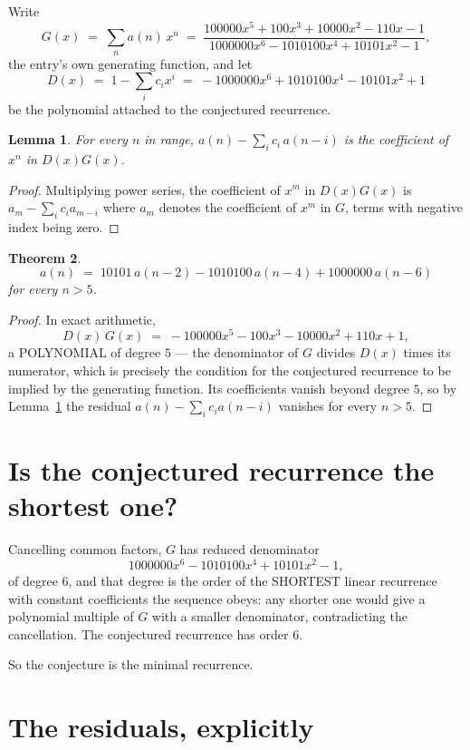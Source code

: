\documentclass[11pt,a4paper]{article}
\theoremstyle{plain}
\newtheorem{theorem}{Theorem}
\newtheorem{lemma}[theorem]{Lemma}
\theoremstyle{definition}
\begin{document}
Write
\[
G(x)\;=\;\sum_{n}a(n)\,x^{n}\;=\;\frac{100000 x^{5} + 100 x^{3} + 10000 x^{2} - 110 x - 1}{1000000 x^{6} - 1010100 x^{4} + 10101 x^{2} - 1},
\]
the entry's own generating function, and let
\[
D(x)\;=\;1-\sum_i c_i x^{i}\;=\;- 1000000 x^{6} + 1010100 x^{4} - 10101 x^{2} + 1
\]
be the polynomial attached to the conjectured recurrence.

\begin{lemma}\label{lem:key}
For every $n$ in range, $a(n)-\sum_i c_i\,a(n-i)$ is the coefficient of $x^{n}$ in
$D(x)G(x)$.
\end{lemma}

\begin{proof}
Multiplying power series, the coefficient of $x^{m}$ in $D(x)G(x)$ is
$a_m-\sum_i c_i a_{m-i}$ where $a_m$ denotes the coefficient of $x^{m}$ in $G$, terms with
negative index being zero.
\end{proof}

\begin{theorem}
\[
a(n)\;=\;10101\,a(n-2) - 1010100\,a(n-4) + 1000000\,a(n-6)
\]
for every $n>5$.
\end{theorem}

\begin{proof}
In exact arithmetic,
\[
D(x)\,G(x)\;=\;- 100000 x^{5} - 100 x^{3} - 10000 x^{2} + 110 x + 1,
\]
a POLYNOMIAL of degree $5$ --- the denominator of $G$ divides $D(x)$ times its numerator,
which is precisely the condition for the conjectured recurrence to be implied by the
generating function. Its coefficients vanish beyond degree $5$, so by
Lemma~\ref{lem:key} the residual $a(n)-\sum_ic_ia(n-i)$ vanishes for every
$n>5$.
\end{proof}

\section{Is the conjectured recurrence the shortest one?}

Cancelling common factors, $G$ has reduced denominator
\[
1000000 x^{6} - 1010100 x^{4} + 10101 x^{2} - 1,
\]
of degree $6$, and that degree is the order of the SHORTEST linear recurrence with
constant coefficients the sequence obeys: any shorter one would give a polynomial multiple of
$G$ with a smaller denominator, contradicting the cancellation. The conjectured recurrence has
order $6$.

So the conjecture is the minimal recurrence.

\section{The residuals, explicitly}
\end{document}
